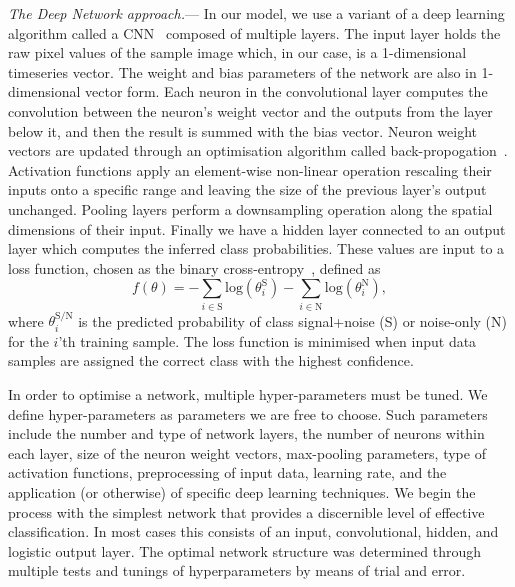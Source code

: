 \documentclass[%
showpacs,
 amsmath,amssymb,
 aps,
 twocolumn,
 prl,
 reprint,
floatfix,
]{revtex4-1}
\begin{document}
%
% 
\textit{The Deep Network approach.}--- 
%
%
In our model, we use a variant of a deep learning algorithm called a
\ac{CNN}~\cite{726791} composed of multiple layers. The input layer holds 
the raw pixel values of the sample image which, in
our case, is a 1-dimensional timeseries vector. The weight and bias parameters 
of the network are also in 1-dimensional vector
form. Each neuron in the convolutional layer computes the convolution between
the neuron's weight vector and the outputs from the layer below it, and then
the result is summed with the bias vector. Neuron weight vectors are updated
through an optimisation algorithm called back-propogation~\cite{LeCun1998}.
Activation functions apply an element-wise non-linear operation rescaling their
inputs onto a specific range and leaving the size of the previous layer's
output unchanged. Pooling layers perform a downsampling operation along the
spatial dimensions of their input. Finally we have a hidden layer connected to an output layer which
computes the inferred class probabilities. These values are input to a loss
function, chosen as the binary cross-entropy~\cite{tensorflow2015-whitepaper},
defined as
%
%
\begin{equation} \label{eq:loss} 
f(\theta) =
-\sum_{i\in\text{S}}\mathrm{log}(\theta^{\text{S}}_{i})-\sum_{i\in\text{N}}\mathrm{log}(\theta^{\text{N}}_{i}), 
\end{equation}
%
where $\theta^{\text{S/N}}_{i}$ is the predicted probability of class
signal+noise (S) or noise-only (N) for the $i$'th training sample. The
loss function is minimised when input data samples are assigned the correct
class with the highest confidence. 

%
%
In order to optimise a network, multiple hyper-parameters must be tuned.  We
define hyper-parameters as parameters we are free to choose. Such
parameters include the number and type of network layers, the
number of neurons within each layer, size of the neuron weight vectors, 
max-pooling parameters, type of activation functions, preprocessing of
input data, learning rate, and the application (or otherwise) of specific deep
learning techniques. We begin the process with the simplest network that
provides a discernible level of effective classification. In most cases this
consists of an input, convolutional, hidden, and logistic output layer.
The optimal network structure was determined through multiple
tests and tunings of hyperparameters by means of trial and error.
\end{document}
